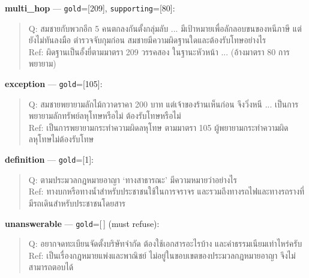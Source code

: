 \documentclass[conference]{IEEEtran}
\providecommand{\TH}{}\renewcommand{\TH}[1]{{\thaifont #1}}
\begin{document}
\smallskip\noindent\textbf{multi\_hop} --- \texttt{gold}=[209], \texttt{supporting}=[80]:
\begin{quote}\footnotesize
Q: \TH{สมชายกับพวกอีก 5 คนตกลงกันตั้งกลุ่มลับ ... มีเป้าหมายเพื่อลักลอบขนของหนีภาษี แต่ยังไม่ทันลงมือ ตำรวจจับกุมก่อน สมชายมีความผิดฐานใดและต้องรับโทษอย่างไร}\\
Ref: \TH{ผิดฐานเป็นอั้งยี่ตามมาตรา 209 วรรคสอง ในฐานะหัวหน้า ... (อ้างมาตรา 80 การพยายาม)}
\end{quote}

\smallskip\noindent\textbf{exception} --- \texttt{gold}=[105]:
\begin{quote}\footnotesize
Q: \TH{สมชายพยายามลักไม้กวาดราคา 200 บาท แต่เจ้าของร้านเห็นก่อน จึงวิ่งหนี ... เป็นการพยายามลักทรัพย์ลหุโทษหรือไม่ ต้องรับโทษหรือไม่}\\
Ref: \TH{เป็นการพยายามกระทำความผิดลหุโทษ ตามมาตรา 105 ผู้พยายามกระทำความผิดลหุโทษไม่ต้องรับโทษ}
\end{quote}

\smallskip\noindent\textbf{definition} --- \texttt{gold}=[1]:
\begin{quote}\footnotesize
Q: \TH{ตามประมวลกฎหมายอาญา ‘ทางสาธารณะ’ มีความหมายว่าอย่างไร}\\
Ref: \TH{ทางบกหรือทางน้ำสำหรับประชาชนใช้ในการจราจร และรวมถึงทางรถไฟและทางรถรางที่มีรถเดินสำหรับประชาชนโดยสาร}
\end{quote}

\smallskip\noindent\textbf{unanswerable} --- \texttt{gold}=[\,] (must refuse):
\begin{quote}\footnotesize
Q: \TH{อยากจดทะเบียนจัดตั้งบริษัทจำกัด ต้องใช้เอกสารอะไรบ้าง และค่าธรรมเนียมเท่าไหร่ครับ}\\
Ref: \TH{เป็นเรื่องกฎหมายแพ่งและพาณิชย์ ไม่อยู่ในขอบเขตของประมวลกฎหมายอาญา จึงไม่สามารถตอบได้}
\end{quote}

\providecommand{\BIBdecl}{}
\renewcommand{\BIBdecl}{\sloppy}


\end{document}
